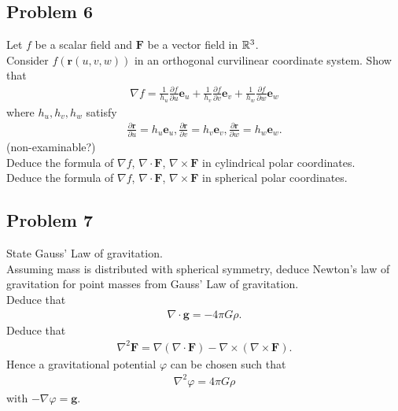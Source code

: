 \documentclass[a4paper]{article}
\begin{document}
\subsection{Problem 6}
Let $f$ be a scalar field and $\mathbf{F}$ be a vector field in $\mathbb{R}^3$.\\
Consider $f\left(\mathbf{r}\left(u,v,w\right)\right)$ in an orthogonal curvilinear coordinate system. Show that 
\begin{equation*}
\begin{aligned}
\nabla f = \frac{1}{h_u} \frac{\partial f}{\partial u} \mathbf{e}_u + \frac{1}{h_v} \frac{\partial f}{\partial v} \mathbf{e}_v + \frac{1}{h_w} \frac{\partial f}{\partial w} \mathbf{e}_w
\end{aligned}
\end{equation*}
where $h_u, h_v, h_w$ satisfy
\begin{equation*}
\begin{aligned}
\frac{\partial \mathbf{r}}{\partial u} = h_u \mathbf{e}_u, \frac{\partial \mathbf{r}}{\partial v} = h_v \mathbf{e}_v, \frac{\partial \mathbf{r}}{\partial w} = h_w \mathbf{e}_w.
\end{aligned}
\end{equation*}
(non-examinable?)\\
Deduce the formula of $\nabla f$, $\nabla \cdot \mathbf{F}$, $\nabla \times \mathbf{F}$ in cylindrical polar coordinates.\\
Deduce the formula of $\nabla f$, $\nabla \cdot \mathbf{F}$, $\nabla \times \mathbf{F}$ in spherical polar coordinates.

\subsection{Problem 7}
State Gauss' Law of gravitation.\\
Assuming mass is distributed with spherical symmetry, deduce Newton's law of gravitation for point masses from Gauss' Law of gravitation.\\
Deduce that
\begin{equation*}
\begin{aligned}
\nabla\cdot \mathbf{g} = -4\pi G \rho.
\end{aligned}
\end{equation*}
Deduce that
\begin{equation*}
\begin{aligned}
\nabla^2 \mathbf{F} = \nabla\left(\nabla\cdot\mathbf{F}\right) - \nabla \times \left(\nabla\times\mathbf{F}\right).
\end{aligned}
\end{equation*}
Hence a gravitational potential $\varphi$ can be chosen such that
\begin{equation*}
\begin{aligned}
\nabla^2 \varphi = 4\pi G\rho
\end{aligned}
\end{equation*}
with $-\nabla \varphi = \mathbf{g}$.
\end{document}
